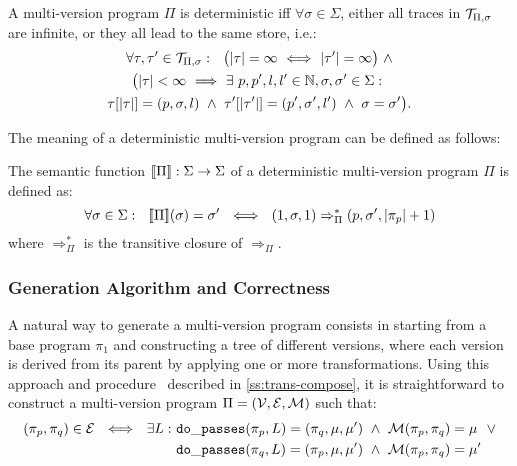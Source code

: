 \begin{definition}
\label{de:deterministic-mvp}
A multi-version program $\Pi$ is deterministic iff $\forall \sigma\in\Sigma$, either all traces in ${\cal T}_{\Pi,\sigma}$ are infinite, or they all lead to the same store, i.e.:
\begin{gather*}
\forall \tau, \tau'\in{\cal T}_{\Pi,\sigma}: ~~ \big(|\tau|=\infty ~ \Longleftrightarrow ~ |\tau'|=\infty\big) ~ \wedge \\
\big(|\tau|<\infty ~ \Longrightarrow ~ \exists~p,p',l,l'\in\mathbb{N}, \sigma,\sigma'\in\Sigma: ~ \\
\tau[|\tau|]=(p,\sigma,l) ~ \wedge ~ \tau'[|\tau'|]=(p',\sigma',l') ~ \wedge ~ \sigma=\sigma' \big).
\end{gather*}
\end{definition}

\noindent The meaning of a deterministic multi-version program can be defined as follows:

\begin{definition}
\label{de:mv-program-semantics}
The semantic function $[\![\Pi]\!]:\Sigma \rightarrow \Sigma$ of a deterministic multi-version program $\Pi$ is defined as: 
$$
\forall \sigma\in\Sigma: ~~ [\![\Pi]\!](\sigma)=\sigma' ~~ \Longleftrightarrow ~~ (1,\sigma,1) \Rightarrow^{*}_{\Pi} (p,\sigma',|\pi_p|+1)
$$
where $\Rightarrow^{*}_{\Pi}$ is the transitive closure of $\Rightarrow_{\Pi}$.
\end{definition}

\subsubsection{Generation Algorithm and Correctness}

A natural way to generate a multi-version program consists in starting from a base program $\pi_1$ and constructing a tree of different versions, where each version is derived from its parent by applying one or more transformations. Using this approach and procedure \dopasses\ described in \mysection\ref{ss:trans-compose}, it is straightforward to construct a multi-version program $\Pi=({\cal V}, {\cal E}, {\cal M})$ such that:
\vspace{-1mm}
\begin{align*}
(\pi_p,\pi_q)\in {\cal E} ~~ \Longleftrightarrow ~~ \exists L: ~ &{\tt do\_passes}(\pi_p,L)=(\pi_q,\mu,\mu') ~ \wedge ~ {\cal M}(\pi_p,\pi_q)=\mu ~~ \vee \\
&{\tt do\_passes}(\pi_q,L)=(\pi_p,\mu,\mu') ~ \wedge ~ {\cal M}(\pi_p,\pi_q)=\mu'
\end{align*}


